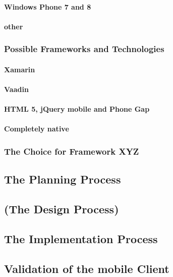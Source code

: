\paragraph{Windows Phone 7 and 8}
\paragraph{other}
\subsubsection{Possible Frameworks and Technologies}
\paragraph{Xamarin}
\paragraph{Vaadin}
\paragraph{HTML 5, jQuery mobile and Phone Gap}
\paragraph{Completely native}
\subsubsection{The Choice for Framework XYZ}
\subsection{The Planning Process}
\subsection{(The Design Process)}
\subsection{The Implementation Process}
\subsection{Validation of the mobile Client}
